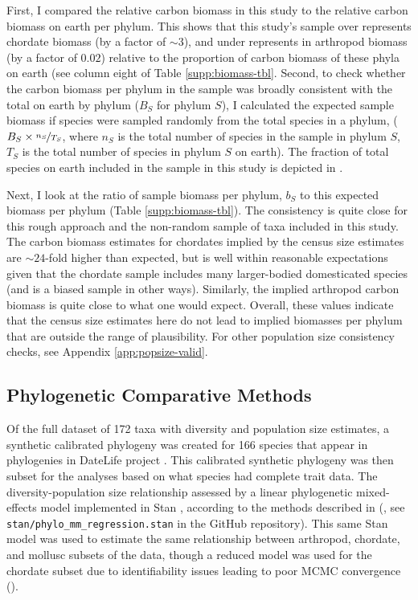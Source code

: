 \documentclass[9pt,lineno]{elife}
\begin{document}
First, I compared the relative carbon biomass in this study to the relative
carbon biomass on earth per phylum. This shows that this study's sample over
represents chordate biomass (by a factor of $\mathord{\sim}3$), and under
represents in arthropod biomass (by a factor of $0.02$) relative to the
proportion of carbon biomass of these phyla on earth (see column eight of
Table \ref{supp:biomass-tbl}. Second, to check whether the carbon
biomass per phylum in the sample was broadly consistent with the total on earth
by phylum ($B_S$ for phylum $S$), I calculated the expected sample biomass if
species were sampled randomly from the total species in a phylum, ($B_S \times
\nicefrac{n_S}{T_S}$, where $n_S$ is the total number of species in the sample
in phylum $S$, $T_S$ is the total number of species in phylum $S$ on earth).
The fraction of total species on earth included in the sample in this study is
depicted in .  

Next, I look at the ratio of sample biomass per phylum, $b_S$ to this expected
biomass per phylum (Table \ref{supp:biomass-tbl}). The
consistency is quite close for this rough approach and the non-random sample of
taxa included in this study. The carbon biomass estimates for chordates implied
by the census size estimates are $\mathord{\sim}24$-fold higher than expected,
but is well within reasonable expectations given that the chordate sample
includes many larger-bodied domesticated species (and is a biased sample in
other ways).  Similarly, the implied arthropod carbon biomass is quite close to
what one would expect. Overall, these values indicate that the census size
estimates here do not lead to implied biomasses per phylum that are outside the
range of plausibility. For other population size consistency checks, see
Appendix \ref{app:popsize-valid}.


\subsection{Phylogenetic Comparative Methods}
\label{sec:methods-pcm}

Of the full dataset of 172 taxa with diversity and population size estimates, a
synthetic calibrated phylogeny was created for 166 species that appear in
phylogenies in DateLife project \citep{OMeara2020-ds,Sanchez-Reyes2019-io}.
This calibrated synthetic phylogeny was then subset for the analyses based on
what species had complete trait data. The diversity-population size
relationship assessed by a linear phylogenetic mixed-effects model implemented
in Stan \citep{Stan_Development_Team2020-ea}, according to the methods
described in (\cite{De_Villemereuil2014-kt}, see
\texttt{stan/phylo\_mm\_regression.stan} in the GitHub repository). This same
Stan model was used to estimate the same relationship between arthropod,
chordate, and mollusc subsets of the data, though a reduced model was used for
the chordate subset due to identifiability issues leading to poor MCMC
convergence (). 
\end{document}
